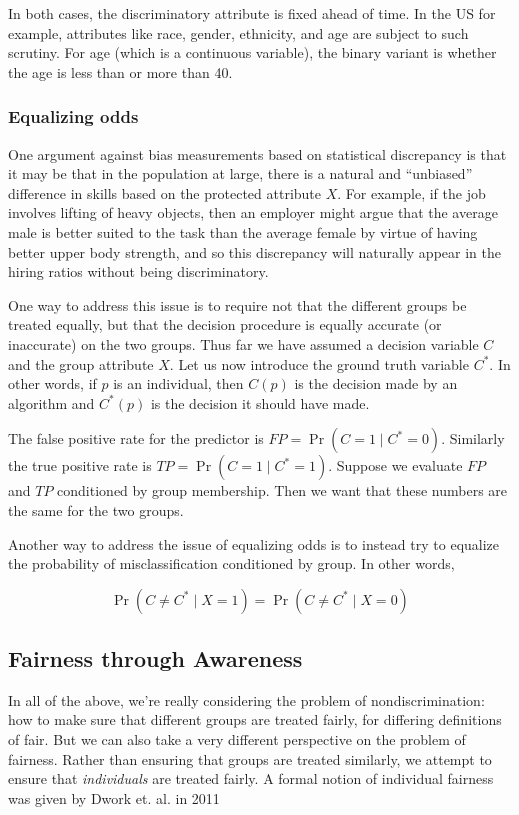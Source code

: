 \documentclass[11pt]{paper}
\begin{document}
In both cases, the discriminatory attribute is fixed ahead of time. In
the US for example, attributes like race, gender, ethnicity, and age are
subject to such scrutiny. For age (which is a continuous variable), the
binary variant is whether the age is less than or more than 40.

\subsubsection{Equalizing odds}\label{equalizing-odds}

One argument against bias measurements based on statistical discrepancy
is that it may be that in the population at large, there is a natural
and ``unbiased'' difference in skills based on the protected attribute
$X$. For example, if the job involves lifting of heavy objects, then an
employer might argue that the average male is better suited to the task
than the average female by virtue of having better upper body strength,
and so this discrepancy will naturally appear in the hiring ratios
without being discriminatory.

One way to address this issue is to require not that the different
groups be treated equally, but that the decision procedure is equally
accurate (or inaccurate) on the two groups. Thus far we have assumed a
decision variable $C$ and the group attribute $X$. Let us now introduce
the ground truth variable $C^*$. In other words, if $p$ is an
individual, then $C(p)$ is the decision made by an algorithm and
$C^*(p)$ is the decision it should have made.

The false positive rate for the predictor is
$FP = \Pr(C = 1 \mid C^* = 0)$. Similarly the true positive rate is
$TP = \Pr(C = 1 \mid C^* = 1)$. Suppose we evaluate $FP$ and $TP$
conditioned by group membership. Then we want that these numbers are the
same for the two groups.

Another way to address the issue of equalizing odds is to instead try to
equalize the probability of misclassification conditioned by group. In
other words,

\[ \Pr(C \ne C^* \mid X = 1) = \Pr(C \ne C^* \mid X = 0)\]

\citep{zafar_fairness_2016}

\subsection{Fairness through
Awareness}\label{fairness-through-awareness}

In all of the above, we're really considering the problem of
nondiscrimination: how to make sure that different groups are treated
fairly, for differing definitions of fair. But we can also take a very
different perspective on the problem of fairness. Rather than ensuring
that groups are treated similarly, we attempt to ensure that
\emph{individuals} are treated fairly. A formal notion of individual
fairness was given by Dwork et. al. in 2011 \citep{dwork_fairness_2012}
\end{document}
